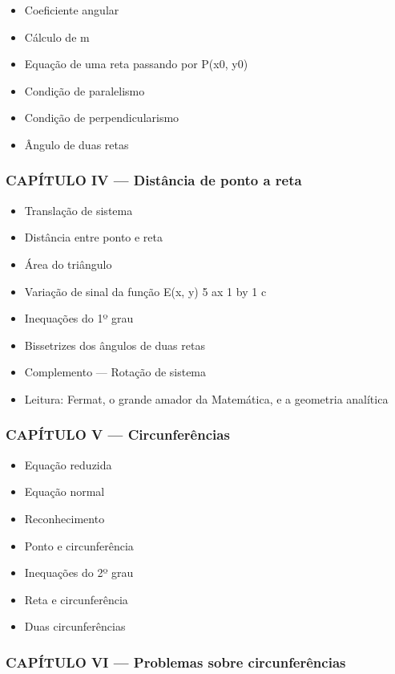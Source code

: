 \documentclass[a4paper,12pt]{article}[abntex2]
\begin{document}
\begin{itemize}
\item Coeficiente angular
\item Cálculo de m
\item Equação de uma reta passando por P(x0, y0)
\item Condição de paralelismo
\item Condição de perpendicularismo
\item Ângulo de duas retas
\end{itemize}
\subsubsection*{CAPÍTULO IV — Distância de ponto a reta}

\begin{itemize}
\item Translação de sistema
\item Distância entre ponto e reta
\item Área do triângulo
\item Variação de sinal da função E(x, y) 5 ax 1 by 1 c
\item Inequações do 1º grau
\item Bissetrizes dos ângulos de duas retas
\item Complemento — Rotação de sistema
\item Leitura: Fermat, o grande amador da Matemática, e a geometria analítica
\end{itemize}
\subsubsection*{CAPÍTULO V — Circunferências}

\begin{itemize}
\item Equação reduzida
\item Equação normal
\item Reconhecimento
\item Ponto e circunferência
\item Inequações do 2º grau
\item Reta e circunferência
\item Duas circunferências
\end{itemize}
\subsubsection*{CAPÍTULO VI — Problemas sobre circunferências}
\end{document}
